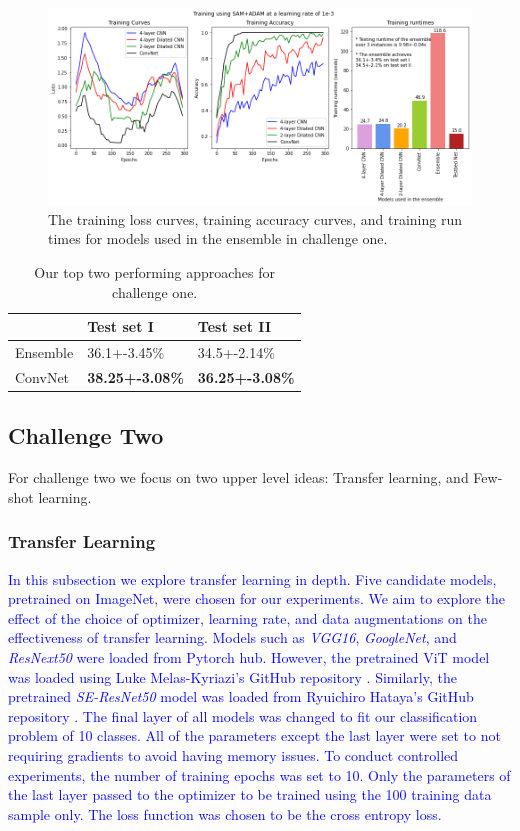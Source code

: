 \documentclass[a4paper,11pt]{article}
\begin{document}
\begin{figure}[h!]
    \centering
    \includegraphics[width=1\linewidth]{best_performing_model_training_test_curves.png}
    \caption{The training loss curves, training accuracy curves, and training run times for models used in the ensemble in challenge one.}
    \label{fig:training_runtime_ch1}
\end{figure}
\begin{table}[t!]
\caption{Our top two performing approaches for challenge one.}
\begin{center}
\begin{tabular}{|l|l|l|}
\hline
         & Test set I             & Test set II            \\ \hline
Ensemble & 36.1+-3.45\%           & 34.5+-2.14\%           \\
ConvNet  & \textbf{38.25+-3.08\%} & \textbf{36.25+-3.08\%} \\ \hline
\end{tabular}
\end{center}
\label{Table:best_models_challenge1}
\end{table}
\subsection{Challenge Two}
For challenge two we focus on two upper level ideas: Transfer learning, and Few-shot learning. 
\subsubsection{Transfer Learning}
\textcolor{blue}{
In this subsection we explore transfer learning in depth. Five candidate models, pretrained on ImageNet, were chosen for our experiments. We aim to explore the effect of the choice of optimizer, learning rate, and data augmentations on the effectiveness of transfer learning. Models such as \textit{VGG16}, \textit{GoogleNet}, and \textit{ResNext50} were loaded from Pytorch hub. However, the pretrained ViT model was loaded using Luke Melas-Kyriazi's GitHub repository \cite{vit_github}. Similarly, the pretrained \textit{SE-ResNet50} model was loaded from Ryuichiro Hataya's GitHub repository \cite{se_resnet_github}. The final layer of all models was changed to fit our classification problem of 10 classes. All of the parameters except the last layer were set to not requiring gradients to avoid having memory issues. To conduct controlled experiments, the number of training epochs was set to 10.  Only the parameters of the last layer passed to the optimizer to be trained using the 100 training data sample only. The loss function was chosen to be the cross entropy loss.}
\end{document}
